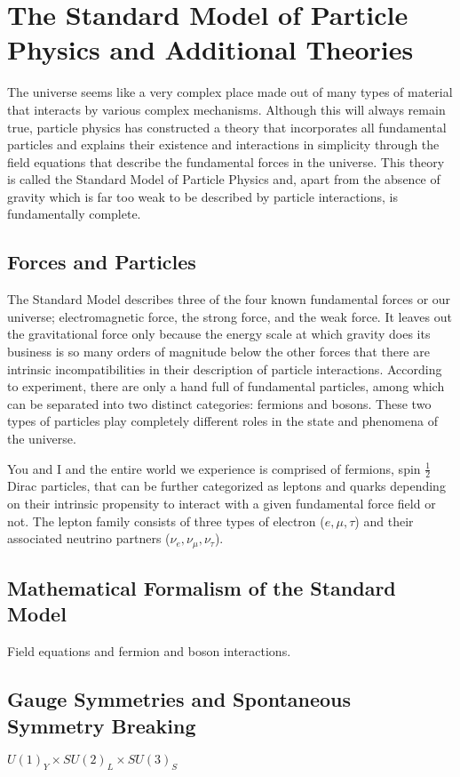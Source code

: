\chapter{The Standard Model of Particle Physics and Additional Theories}
The universe seems like a very complex place made out of many types of material that interacts by various complex mechanisms.  Although this will always remain true, particle physics has constructed a theory that incorporates all fundamental particles and explains their existence and interactions in simplicity through the field equations that describe the fundamental forces in the universe.  This theory is called the Standard Model of Particle Physics and, apart from the absence of gravity which is far too weak to be described by particle interactions, is fundamentally complete.


\section{Forces and Particles}
\label{sec:theory1}
The Standard Model describes three of the four known fundamental forces or our universe; electromagnetic force, the strong force, and the weak force.  It leaves out the gravitational force only because the energy scale at which gravity does its business is so many orders of magnitude below the other forces that there are intrinsic incompatibilities in their description of particle interactions.  According to experiment, there are only a hand full of fundamental particles, among which can be separated into two distinct categories: fermions and bosons.  These two types of particles play completely different roles in the state and phenomena of the universe. \cite{tully}

You and I and the entire world we experience is comprised of fermions, spin $\frac{1}{2}$ Dirac particles, that can be further categorized as leptons and quarks depending on their intrinsic propensity to interact with a given fundamental force field or not.  The lepton family consists of three types of electron ($e, \mu, \tau$) and their associated neutrino partners ($\nu_e, \nu_\mu, \nu_\tau$).

\section{Mathematical Formalism of the Standard Model}
\label{sec:theory2}
Field equations and fermion and boson interactions.

\section{Gauge Symmetries and Spontaneous Symmetry Breaking}
\label{sec:theory3}
$U(1)_{Y} \times SU(2)_{L} \times SU(3)_{S}$


